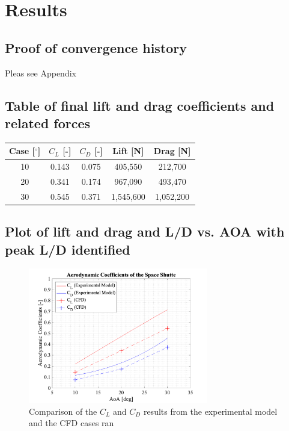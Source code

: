 \section{Results}

\subsection{Proof of convergence history}
Pleas see Appendix
\subsection{Table of final lift and drag coefficients and related forces}
\begin{table}[H]
	\centering
	\begin{tabular}{|c|c|c|c|c|} \hline
		\centering
		\textbf{Case [$^\circ$]} & $C_L$ [-]   & $C_D$ [-]   & Lift [N] & Drag [N]  \\ \hline
		10         & 0.143 & 0.075 & 405,550 & 212,700\\ \hline
		20         & 0.341 & 0.174 & 967,090 & 493,470\\ \hline
		30         & 0.545 & 0.371 & 1,545,600 & 1,052,200\\ \hline
	\end{tabular}
\end{table}

\subsection{Plot of lift and drag and L/D vs. AOA with peak L/D identified}

\begin{figure}[H]
 \centering
 \includegraphics[width=0.7\textwidth]{matlab_images/aero_coeff_comp.png}
 \caption{Comparison of the $C_L$ and $C_D$ results from the experimental model and the CFD cases ran}
 \label{fig: aero_coeff_comp}
\end{figure}

